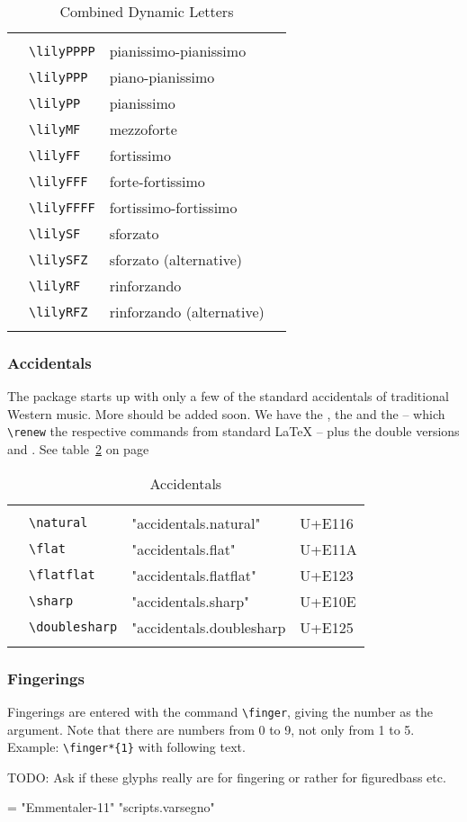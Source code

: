 \documentclass{article}
\newcommand*{\cmd}[1]{\texttt{\textbackslash #1}}
\newcommand{\tmpCaption}{} %
\newcommand{\tmpLabel}{}
\newenvironment{reftable}[2]
	{%
		\renewcommand{\tmpCaption}{#1}
		\renewcommand{\tmpLabel}{#2}
		\begin{table}[ht]
		\begin{center}
		\begin{tabular}[t]{llll}
		\hline
		&\\
	}
	{%
		&\\
		\hline
		\end{tabular}
		\caption{\tmpCaption}
		\label{table:\tmpLabel}
		\end{center}
		\end{table}
	}
\begin{document}
\begin{reftable}{Combined Dynamic Letters}{combinedDynLetters}
\lilyPPPP* & \cmd{lilyPPPP} & pianissimo-pianissimo\\
\lilyPPP* & \cmd{lilyPPP} & piano-pianissimo\\
\lilyPP* & \cmd{lilyPP} & pianissimo\\
\lilyMF* & \cmd{lilyMF} & mezzoforte\\
\lilyFF* & \cmd{lilyFF} & fortissimo\\
\lilyFFF* & \cmd{lilyFFF} & forte-fortissimo\\
\lilyFFFF* & \cmd{lilyFFFF} & fortissimo-fortissimo\\

\lilySF* & \cmd{lilySF} & sforzato\\
\lilySFZ* & \cmd{lilySFZ} & sforzato (alternative)\\
\lilyRF* & \cmd{lilyRF} & rinforzando\\
\lilyRFZ* & \cmd{lilyRFZ} & rinforzando (alternative)\\

\end{reftable}

\subsubsection{Accidentals}
The package starts up with only a few of the standard accidentals of traditional Western music. More should be added soon. We have the \natural, the \flat* and the \sharp* -- which \cmd{renew} the respective commands from standard \LaTeX{} -- plus the double versions \flatflat* and \doublesharp. See table~\ref{table:accidentals} on page~\pageref{table:accidentals}

\begin{reftable}{Accidentals}{accidentals}
\natural & \cmd{natural} & "accidentals.natural" & U+E116\\
\flat & \cmd{flat} & "accidentals.flat" & U+E11A\\
\flatflat & \cmd{flatflat} & "accidentals.flatflat" & U+E123\\
\sharp & \cmd{sharp} & "accidentals.sharp" & U+E10E\\
\doublesharp & \cmd{doublesharp} & "accidentals.doublesharp & U+E125\\
\end{reftable}

\subsubsection{Fingerings}
Fingerings are entered with the command \cmd{finger}, giving the number as the argument. Note that there are numbers from 0 to 9, not only from 1 to 5. Example: \cmd{finger*\{1\}}
with following text.

TODO: Ask if these glyphs really are for fingering or rather for figuredbass etc.


\font\1 = "Emmentaler-11"
  \1
  \XeTeXglyph \the\XeTeXglyphindex "scripts.varsegno"
\end{document}

